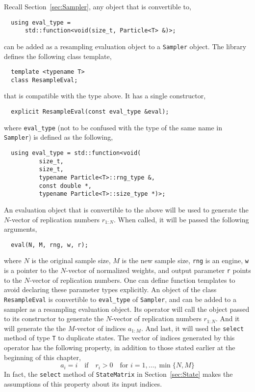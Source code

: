 Recall Section~\ref{sec:Sampler}, any object that is convertible to,
\begin{Verbatim}
  using eval_type =
      std::function<void(size_t, Particle<T> &)>;
\end{Verbatim}
can be added as a resampling evaluation object to a \verb|Sampler| object. The
library defines the following class template,
\begin{Verbatim}
  template <typename T>
  class ResampleEval;
\end{Verbatim}
that is compatible with the type above. It has a single constructor,
\begin{Verbatim}
  explicit ResampleEval(const eval_type &eval);
\end{Verbatim}
where \verb|eval_type| (not to be confused with the type of the same name in
\verb|Sampler|) is defined as the following,
\begin{Verbatim}
  using eval_type = std::function<void(
          size_t,
          size_t,
          typename Particle<T>::rng_type &,
          const double *,
          typename Particle<T>::size_type *)>;
\end{Verbatim}
An evaluation object that is convertible to the above will be used to generate
the $N$-vector of replication numbers $r_{1:N}$. When called, it will be passed
the following arguments,
\begin{Verbatim}
  eval(N, M, rng, w, r);
\end{Verbatim}
where $N$ is the original sample size, $M$ is the new sample size, \verb|rng|
is an \rng engine, \verb|w| is a pointer to the $N$-vector of normalized
weights, and output parameter \verb|r| points to the $N$-vector of replication
numbers. One can define function templates to avoid declaring these parameter
types explicitly. An object of the class \verb|ResampleEval| is convertible to
\verb|eval_type| of \verb|Sampler|, and can be added to a sampler as a
resampling evaluation object. Its operator will call the object passed to its
constructor to generate the $N$-vector of replication numbers $r_{1:N}$. And it
will generate the the $M$-vector of indices $a_{1:M}$. And last, it will used
the \verb|select| method of type \verb|T| to duplicate states. The vector of
indices generated by this operator has the following property, in addition to
those stated earlier at the beginning of this chapter,
\begin{equation*}
  a_i = i \quad \text{if} \quad  r_i > 0 \quad
  \text{for } i = 1,\dots,\min\{N, M\}
\end{equation*}
In fact, the \verb|select| method of \verb|StateMatrix| in
Section~\ref{sec:State} makes the assumptions of this property about its input
indices.

